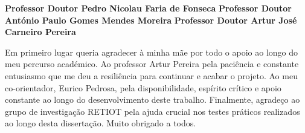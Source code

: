 \TitlePage
  \vspace*{55mm}
       {}
       {\textbf{Professor Doutor Pedro Nicolau Faria de Fonseca}}
  \vspace*{5mm}
       {\textbf{Professor Doutor Ant\'onio Paulo Gomes Mendes Moreira}}
  \vspace*{5mm}
  \TEXT{}
       {\textbf{Professor Doutor Artur Jos\'e Carneiro Pereira}}
\EndTitlePage
\titlepage\ \endtitlepage %

\TitlePage
  \vspace*{55mm}
       {Em primeiro lugar queria agradecer à minha mãe por todo o apoio ao
        longo do meu percurso académico. Ao professor Artur Pereira pela paciência e cons\-tan\-te entusiasmo que me deu a resiliência para continuar e acabar o projeto.
     Ao meu co-orientador, Eurico Pedrosa, pela disponibilidade, espírito
crítico e apoio constante ao longo do desenvolvimento deste trabalho.
Finalmente, agradeço ao grupo de investigação RETIOT pela ajuda
crucial nos testes práticos realizados ao longo desta dissertação.
Muito obrigado a todos.
       }
  \TEXT{}
       {%
       }

